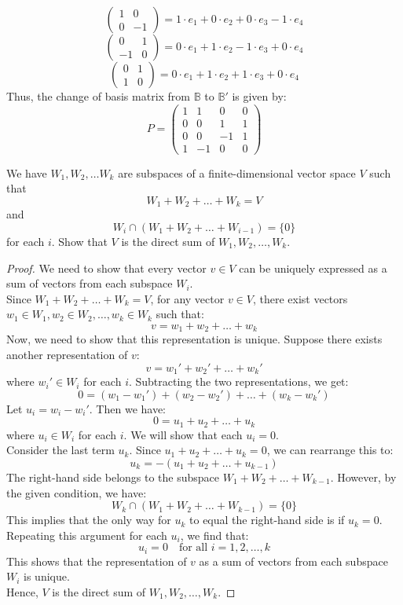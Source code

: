 \documentclass[openany]{book}
\begin{document}
\[
\begin{pmatrix}1 & 0 \\ 0 & -1 \end{pmatrix} = 1 \cdot e_1 + 0 \cdot e_2 + 0 \cdot e_3 - 1 \cdot e_4
\]
\[
\begin{pmatrix}0 & 1 \\ -1 & 0 \end{pmatrix} = 0 \cdot e_1 + 1 \cdot e_2 - 1 \cdot e_3 + 0 \cdot e_4
\]
\[
\begin{pmatrix}0 & 1 \\ 1 & 0 \end{pmatrix} = 0 \cdot e_1 + 1 \cdot e_2 + 1 \cdot e_3 + 0 \cdot e_4
\]
Thus, the change of basis matrix from $\mathbb{B}$ to $\mathbb{B'}$ is given by:
\[P = \begin{pmatrix}
1 & 1 & 0 & 0 \\
0 & 0 & 1 & 1 \\
0 & 0 & -1 & 1 \\
1 & -1 & 0 & 0
\end{pmatrix}
\]
\begin{exercise}
    We have $W_1, W_2, \ldots W_k$ are subspaces of a finite-dimensional vector space $V$ such that $$W_1 + W_2 + \ldots + W_k = V$$ and $$W_i \cap (W_1 + W_2 + \ldots + W_{i-1}) = \{0\}$$ for each $i$. Show that $V$ is the direct sum of $W_1, W_2, \ldots, W_k$.
\end{exercise}
\begin{proof}
    We need to show that every vector \( v \in V \) can be uniquely expressed as a sum of vectors from each subspace \( W_i \). \\
    Since \( W_1 + W_2 + \ldots + W_k = V \), for any vector \( v \in V \), there exist vectors \( w_1 \in W_1, w_2 \in W_2, \ldots, w_k \in W_k \) such that:
    \[
    v = w_1 + w_2 + \ldots + w_k
    \]
    Now, we need to show that this representation is unique. Suppose there exists another representation of \( v \):
    \[
    v = w_1' + w_2' + \ldots + w_k'
    \]
    where \( w_i' \in W_i \) for each \( i \). Subtracting the two representations, we get:
    \[
    0 = (w_1 - w_1') + (w_2 - w_2') + \ldots + (w_k - w_k')
    \]
    Let \( u_i = w_i - w_i' \). Then we have:
    \[
    0 = u_1 + u_2 + \ldots + u_k
    \]
    where \( u_i \in W_i \) for each \( i \). We will show that each \( u_i = 0 \). \\
    Consider the last term \( u_k \). Since \( u_1 + u_2 + \ldots + u_k = 0 \), we can rearrange this to:
    \[
    u_k = -(u_1 + u_2 + \ldots + u_{k-1})
    \]
    The right-hand side belongs to the subspace \( W_1 + W_2 + \ldots + W_{k-1} \). However, by the given condition, we have:
    \[
    W_k \cap (W_1 + W_2 + \ldots + W_{k-1}) = \{0\}
    \]
    This implies that the only way for \( u_k \) to equal the right-hand side is if \( u_k = 0 \). \\
    Repeating this argument for each \( u_i \), we find that:
    \[
    u_i = 0 \quad \text{for all } i = 1, 2, \ldots, k
    \]
    This shows that the representation of \( v \) as a sum of vectors from each subspace \( W_i \) is unique. \\
    Hence, \( V \) is the direct sum of \( W_1, W_2, \ldots, W_k \).
\end{proof}
\end{document}
